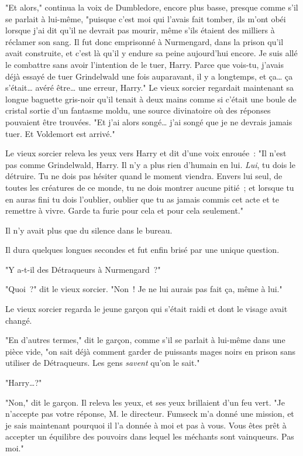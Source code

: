 "Et alors," continua la voix de Dumbledore, encore plus basse, presque comme s'il se parlait à lui-même, "puisque c'est moi qui l'avais fait tomber, ils m'ont obéi lorsque j'ai dit qu'il ne devrait pas mourir, même s'ils étaient des milliers à réclamer son sang. Il fut donc emprisonné à Nurmengard, dans la prison qu'il avait construite, et c'est là qu'il y endure sa peine aujourd'hui encore. Je suis allé le combattre sans avoir l'intention de le tuer, Harry. Parce que vois-tu, j'avais déjà essayé de tuer Grindelwald une fois auparavant, il y a longtemps, et ça… ça s'était… avéré être… une erreur, Harry." Le vieux sorcier regardait maintenant sa longue baguette gris-noir qu'il tenait à deux mains comme si c'était une boule de cristal sortie d'un fantasme moldu, une source divinatoire où des réponses pouvaient être trouvées. "Et j'ai alors songé… j'ai songé que je ne devrais jamais tuer. Et Voldemort est arrivé."

Le vieux sorcier releva les yeux vers Harry et dit d'une voix enrouée~: "Il n'est pas comme Grindelwald, Harry. Il n'y a plus rien d'humain en lui. \emph{Lui}, tu dois le détruire. Tu ne dois pas hésiter quand le moment viendra. Envers lui seul, de toutes les créatures de ce monde, tu ne dois montrer aucune pitié~; et lorsque tu en auras fini tu dois l'oublier, oublier que tu as jamais commis cet acte et te remettre à vivre. Garde ta furie pour cela et pour cela seulement."

Il n'y avait plus que du silence dans le bureau.

Il dura quelques longues secondes et fut enfin brisé par une unique question.

"Y a-t-il des Détraqueurs à Nurmengard~?"

"Quoi~?" dit le vieux sorcier. "Non~! Je ne lui aurais pas fait ça, même à lui."

\later

Le vieux sorcier regarda le jeune garçon qui s'était raidi et dont le visage avait changé.

"En d'autres termes," dit le garçon, comme s'il se parlait à lui-même dans une pièce vide, "on sait déjà comment garder de puissants mages noirs en prison sans utiliser de Détraqueurs. Les gens \emph{savent} qu'on le sait."

"Harry…?"

"Non," dit le garçon. Il releva les yeux, et ses yeux brillaient d'un feu vert. "Je n'accepte pas votre réponse, M. le directeur. Fumseck m'a donné une mission, et je sais maintenant pourquoi il l'a donnée à moi et pas à vous. Vous êtes prêt à accepter un équilibre des pouvoirs dans lequel les méchants sont vainqueurs. Pas moi."

